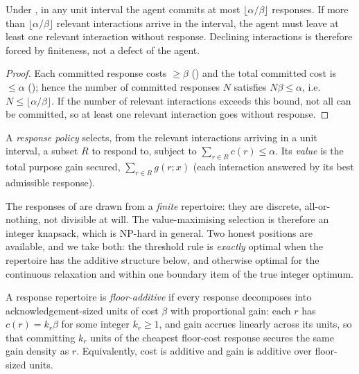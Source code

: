\documentclass[11pt,twocolumn,a4paper]{article}
\newcommand{\resp}{r}                %
\newcommand{\floorc}{\beta}          %
\newcommand{\att}{\alpha}            %
\newcommand{\cost}{c}                %
\newcommand{\gain}{g}                %
\begin{document}
\begin{theorem}
\label{thm:inattention}
Under , in any unit interval the agent commits
at most $\lfloor\att/\floorc\rfloor$ responses. If more than
$\lfloor\att/\floorc\rfloor$ relevant interactions arrive in the interval,
the agent must leave at least one relevant interaction without response.
Declining interactions is therefore forced by finiteness, not a defect of
the agent.
\end{theorem}

\begin{proof}
Each committed response costs $\ge\floorc$ () and the total
committed cost is $\le\att$ (); hence the number of
committed responses $N$ satisfies $N\floorc\le\att$, i.e.
$N\le\lfloor\att/\floorc\rfloor$. If the number of relevant interactions
exceeds this bound, not all can be committed, so at least one relevant
interaction goes without response.
\end{proof}

\begin{definition}
\label{def:policy}
A \emph{response policy} selects, from the relevant interactions arriving
in a unit interval, a subset $R$ to respond to, subject to
$\sum_{\resp\in R}\cost(\resp)\le\att$. Its \emph{value} is the total
purpose gain secured, $\sum_{\resp\in R}\gain(\resp;x)$ (each interaction
answered by its best admissible response).
\end{definition}

The responses of  are drawn from a \emph{finite}
repertoire: they are discrete, all-or-nothing, not divisible at will. The
value-maximising selection is therefore an integer knapsack, which is
NP-hard in general. Two honest positions are available, and we take both:
the threshold rule is \emph{exactly} optimal when the repertoire has the
additive structure below, and otherwise optimal for the continuous
relaxation and within one boundary item of the true integer optimum.

\begin{definition}
\label{def:additive}
A response repertoire is \emph{floor-additive} if every response decomposes
into acknowledgement-sized units of cost $\floorc$ with proportional gain:
each $\resp$ has $\cost(\resp)=k_\resp\floorc$ for some integer
$k_\resp\ge1$, and gain accrues linearly across its units, so that
committing $k_\resp$ units of the cheapest floor-cost response secures the
same gain density as $\resp$. Equivalently, cost is additive and gain is
additive over floor-sized units.
\end{definition}
\end{document}
